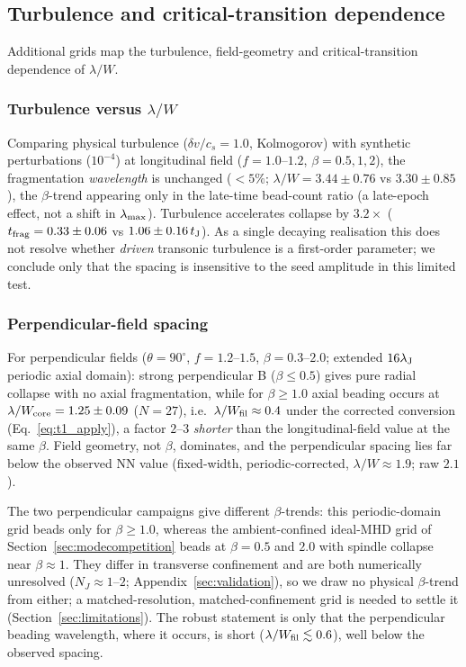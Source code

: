 \documentclass[usenatbib,twoside,twocolumn]{mnras}
\begin{document}
\subsection{Turbulence and critical-transition dependence}
\label{sec:supplementary_campaigns}

Additional grids map the turbulence, field-geometry and critical-transition dependence of $\lambda/W$.

\subsubsection{Turbulence versus $\lambda/W$}

Comparing physical turbulence ($\delta v/c_s=1.0$, Kolmogorov) with synthetic perturbations ($10^{-4}$) at longitudinal field ($f=1.0$--$1.2$, $\beta=0.5,1,2$), the fragmentation \textit{wavelength} is unchanged ($<5\%$; $\lambda/W=3.44\pm0.76$ vs $3.30\pm0.85$), the $\beta$-trend appearing only in the late-time bead-count ratio (a late-epoch effect, not a shift in $\lambda_{\rm max}$). Turbulence accelerates collapse by $3.2\times$ ($t_{\rm frag}=0.33\pm0.06$ vs $1.06\pm0.16\,t_{\rm J}$). As a single decaying realisation this does not resolve whether \emph{driven} transonic turbulence is a first-order parameter; we conclude only that the spacing is insensitive to the seed amplitude in this limited test.

\subsubsection{Perpendicular-field spacing}

For perpendicular fields ($\theta=90^\circ$, $f=1.2$--$1.5$, $\beta=0.3$--$2.0$; extended $16\lambda_{\rm J}$ periodic axial domain): strong perpendicular B ($\beta\leq0.5$) gives pure radial collapse with no axial fragmentation, while for $\beta\geq1.0$ axial beading occurs at $\lambda/W_{\rm core}=1.25\pm0.09$ ($N=27$), i.e.\ $\lambda/W_{\rm fil}\approx0.4$ under the corrected conversion (Eq.~\ref{eq:t1_apply}), a factor $2$--$3$ \textit{shorter} than the longitudinal-field value at the same $\beta$. Field geometry, not $\beta$, dominates, and the perpendicular spacing lies far below the observed NN value (fixed-width, periodic-corrected, $\lambda/W\approx1.9$; raw $2.1$).

The two perpendicular campaigns give different $\beta$-trends: this periodic-domain grid beads only for $\beta\geq1.0$, whereas the ambient-confined ideal-MHD grid of Section~\ref{sec:modecompetition} beads at $\beta=0.5$ and $2.0$ with spindle collapse near $\beta\approx1$. They differ in transverse confinement and are both numerically unresolved ($N_J\approx1$--$2$; Appendix~\ref{sec:validation}), so we draw no physical $\beta$-trend from either; a matched-resolution, matched-confinement grid is needed to settle it (Section~\ref{sec:limitations}). The robust statement is only that the perpendicular beading wavelength, where it occurs, is short ($\lambda/W_{\rm fil}\lesssim0.6$), well below the observed spacing.
\end{document}
